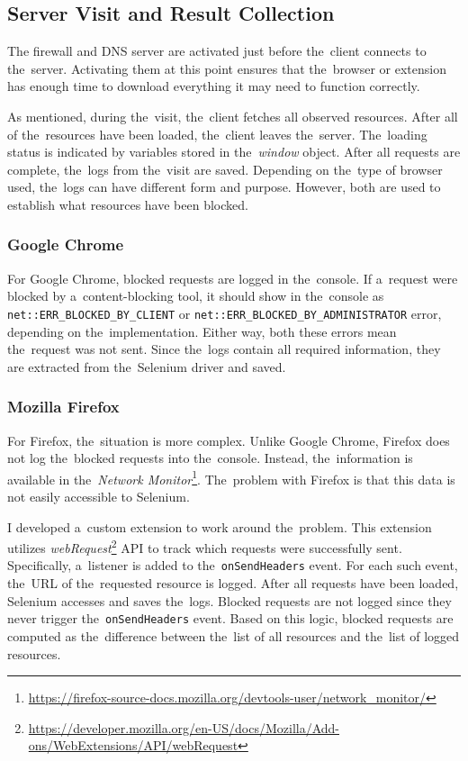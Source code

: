 \subsection{Server Visit and Result Collection}
\label{server-visit-and-result-colleciton}
The firewall and DNS server are activated just before the~client connects to the~server. Activating them at this point ensures that the~browser or extension has enough time to download everything it may need to function correctly.

As mentioned, during the~visit, the~client fetches all observed resources. After all of the~resources have been loaded, the~client leaves the~server. The~loading status is indicated by variables stored in the~\textit{window} object. After all requests are complete, the~logs from the~visit are saved. Depending on the~type of browser used, the~logs can have different form and purpose. However, both are used to establish what resources have been blocked.

\subsubsection{Google Chrome}
For Google Chrome, blocked requests are logged in the~console. If a~request were blocked by a~content-blocking tool, it should show in the~console as \texttt{net::ERR\_BLOCKED\_BY\_CLIENT} or \texttt{net::ERR\_BLOCKED\_BY\_ADMINISTRATOR} error, depending on the~implementation. Either way, both these errors mean the~request was not sent. Since the~logs contain all required information, they are extracted from the~Selenium driver and saved.

\subsubsection{Mozilla Firefox}
\label{custom_logging_extension_label}
For Firefox, the~situation is more complex. Unlike Google Chrome, Firefox does not log the~blocked requests into the~console. Instead, the~information is available in the~\textit{Network Monitor}\footnote{\url{https://firefox-source-docs.mozilla.org/devtools-user/network\_monitor/}}. The~problem with Firefox is that this data is not easily accessible to Selenium.

I developed a~custom extension to work around the~problem. This extension utilizes \textit{webRequest}\footnote{\url{https://developer.mozilla.org/en-US/docs/Mozilla/Add-ons/WebExtensions/API/webRequest}} API to track which requests were successfully sent. Specifically, a~listener is added to the~\texttt{onSendHeaders} event. For each such event, the~URL of the~requested resource is logged. After all requests have been loaded, Selenium accesses and saves the~logs. Blocked requests are not logged since they never trigger the~\texttt{onSendHeaders} event. Based on this logic, blocked requests are computed as the~difference between the~list of all resources and the~list of logged resources.

